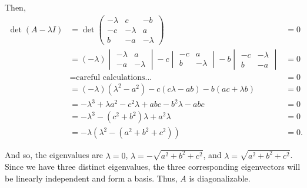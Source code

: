 \documentclass[12pt]{article}
\begin{document}
Then,
\begin{align*}
    \det(A-\lambda I) &= \det\begin{pmatrix} 
        -\lambda & c & -b \\ 
        -c & -\lambda & a \\ 
        b & -a & -\lambda 
    \end{pmatrix}
    &= 0 \\
    &= (-\lambda) \begin{vmatrix} 
        -\lambda & a \\ 
        -a & -\lambda 
    \end{vmatrix}
    - c \begin{vmatrix} 
        -c & a \\ 
        b & -\lambda 
    \end{vmatrix}
    - b \begin{vmatrix} 
        -c & -\lambda \\ 
        b & -a 
    \end{vmatrix} &= 0\\
    &= \text{careful calculations...} &= 0\\
    &= (-\lambda)(\lambda^2 - a^2) - c(c\lambda - ab) - b(ac + \lambda b) &= 0\\
    &= -\lambda^3 + \lambda a^2 - c^2\lambda + abc - b^2\lambda - abc &= 0 \\
    &= -\lambda^3 - (c^2 + b^2)\lambda + a^2\lambda &= 0\\
    &= -\lambda \left( \lambda^2 - (a^2 + b^2 + c^2) \right) &= 0.
\end{align*}

And so, the eigenvalues are $\lambda=0$, $\lambda=-\sqrt{a^2 + b^2 + c^2}$, and $\lambda=\sqrt{a^2 + b^2 + c^2}$. Since we have three distinct eigenvalues, the three corresponding eigenvectors will be linearly independent and form a basis. Thus, $A$ is diagonalizable.
\end{document}
